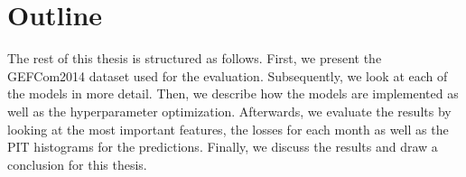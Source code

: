 \section{Outline}
\label{sec:outline}

The rest of this thesis is structured as follows.
First, we present the GEFCom2014 dataset used for the evaluation. 
Subsequently, we look at each of the models in more detail. 
Then, we describe how the models are implemented as well as 
the hyperparameter optimization.
Afterwards, we evaluate the results by looking at the 
most important features, the losses for each month as well as 
the PIT histograms for the predictions. 
Finally, we discuss the results and draw a conclusion for this thesis.